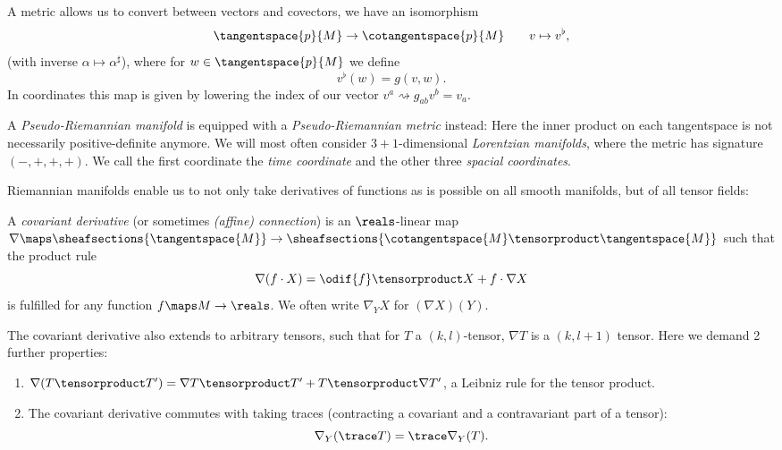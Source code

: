 \documentclass[titlepage,numbers=noenddot,headinclude,oneside,%
footinclude=true,cleardoublepage=empty,%
BCOR=5mm,paper=a4,fontsize=11pt,%
english,%
]{scrartcl}
\begin{document}
\begin{remark}
    A metric allows us to convert between vectors and covectors, \ie we have an isomorphism
    \begin{equation*}
        \tangentspace{p}{M}\to \cotangentspace{p}{M}\qquad v\mapsto v^\flat,
    \end{equation*}
    (with inverse \( \alpha\mapsto \alpha^{\sharp} \)), where for \( w\in \tangentspace{p}{M} \) we define
    \begin{equation*}
        v^{\flat}(w)=g(v,w).
    \end{equation*}
    In coordinates this map is given by lowering the index of our vector \ie \( v^a\rightsquigarrow g_{ab}v^b=v_a \).
\end{remark}
\begin{remark}
    A \emph{Pseudo-Riemannian manifold} is equipped with a \emph{Pseudo-Riemannian metric} instead: Here the inner product on each tangentspace is not necessarily positive-definite anymore. We will most often consider \( 3+1 \)-dimensional \emph{Lorentzian manifolds}, where the metric has signature \( (-,+,+,+) \). We call the first coordinate the \emph{time coordinate} and the other three \emph{spacial coordinates}.
\end{remark}
Riemannian manifolds enable us to not only take derivatives of functions as is possible on all smooth manifolds, but of all tensor fields:
\begin{definition}
    A \emph{covariant derivative} (or sometimes \emph{(affine) connection}) is an \( \reals \)-linear map \( \nabla\maps \sheafsections{\tangentspace{M}}\to \sheafsections{\cotangentspace{M}\tensorproduct \tangentspace{M}} \) such that the product rule
    \begin{equation*}
        \nabla(f\cdot X)=\odif{f}\tensorproduct X+f\cdot \nabla X
    \end{equation*}
    is fulfilled for any function \( f \maps M\to \reals\). We often write \( \nabla_Y X \) for \( (\nabla X)(Y) \).

    The covariant derivative also extends to arbitrary tensors, such that for \( T \) a \( (k,l) \)-tensor, \( \nabla T \) is a \( (k,l+1) \) tensor. Here we demand 2 further properties:
    \begin{enumerate}
        \item \( \nabla(T\tensorproduct T')=\nabla T\tensorproduct T'+T\tensorproduct \nabla T' \), \ie a Leibniz rule for the tensor product.
        \item The covariant derivative commutes with taking traces (contracting a covariant and a contravariant part of a tensor):
        \begin{equation*}
            \nabla_Y (\trace T)=\trace \nabla_Y(T).
        \end{equation*}
    \end{enumerate}
\end{definition}
\end{document}
